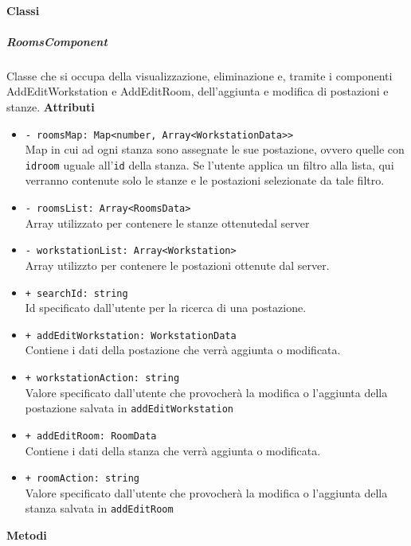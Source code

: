 \paragraph{Classi}
\subparagraph{RoomsComponent}
Classe che si occupa della visualizzazione, eliminazione e, tramite i componenti AddEditWorkstation e AddEditRoom, dell'aggiunta e modifica di postazioni e stanze.
\textbf{Attributi}
\begin{itemize}
	\item \texttt{- roomsMap: Map<number, Array<WorkstationData>>} \\
		Map in cui ad ogni stanza sono assegnate le sue postazione, ovvero quelle con \texttt{idroom} uguale all'\texttt{id} della stanza. Se l'utente applica un filtro alla lista, qui verranno contenute solo le stanze e le postazioni selezionate da tale filtro.
	\item \texttt{- roomsList: Array<RoomsData>} \\
		Array utilizzato per contenere le stanze ottenutedal server
	\item \texttt{- workstationList: Array<Workstation>} \\
		Array utilizzto per contenere le postazioni ottenute dal server.
	\item \texttt{+ searchId: string} \\
		Id specificato dall'utente per la ricerca di una postazione.
	\item \texttt{+ addEditWorkstation: WorkstationData} \\
		Contiene i dati della postazione che verrà aggiunta o modificata.
	\item \texttt{+ workstationAction: string} \\
		Valore specificato dall'utente che provocherà la modifica o l'aggiunta della postazione salvata in \texttt{addEditWorkstation}
	\item \texttt{+ addEditRoom: RoomData} \\
		Contiene i dati della stanza che verrà aggiunta o modificata.
	\item \texttt{+ roomAction: string} \\
		Valore specificato dall'utente che provocherà la modifica o l'aggiunta della stanza salvata in \texttt{addEditRoom}
\end{itemize}
\textbf{Metodi}
